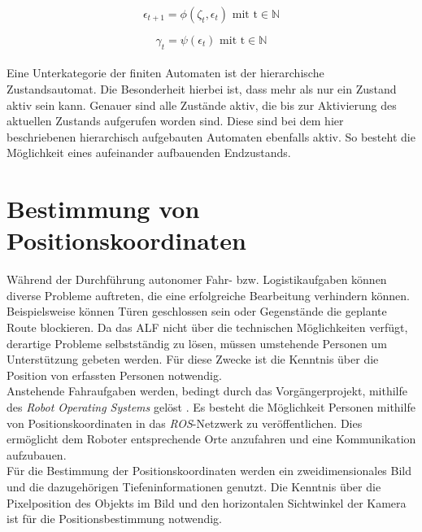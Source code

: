 	\begin{equation}
		\epsilon_{t+1}=\phi(\zeta_t,\epsilon_t)\text{    mit    t}\in\mathbb{N}
		\label{eq: Mealy1}
	\end{equation}
	
	\begin{equation}
		\gamma_t=\psi(\epsilon_t)\text{    mit    t}\in\mathbb{N}
		\label{eq: Mealy2}
	\end{equation}
	\\
	
	
	Eine Unterkategorie der finiten Automaten ist der hierarchische Zustandsautomat. Die Besonderheit hierbei ist, dass mehr als nur ein Zustand aktiv sein kann. Genauer sind alle Zustände aktiv, die bis zur Aktivierung des aktuellen Zustands aufgerufen worden sind. Diese sind bei dem hier beschriebenen hierarchisch aufgebauten Automaten ebenfalls aktiv. So besteht die Möglichkeit eines aufeinander aufbauenden Endzustands. \cite{hsm}
	
	
		
	
	\section{Bestimmung von Positionskoordinaten}
	\label{sec: Bestimmung der Positionskoordinaten}
		Während der Durchführung autonomer Fahr- bzw. Logistikaufgaben können diverse Probleme auftreten, die eine erfolgreiche Bearbeitung verhindern können. Beispielsweise können Türen geschlossen sein oder Gegenstände die geplante Route blockieren. Da das ALF nicht über die technischen Möglichkeiten verfügt, derartige Probleme selbstständig zu lösen, müssen umstehende Personen um Unterstützung gebeten werden. Für diese Zwecke ist die Kenntnis über die Position von erfassten Personen notwendig.\\
		
	
		Anstehende Fahraufgaben werden, bedingt durch das Vorgängerprojekt, mithilfe des \textit{Robot Operating Systems} gelöst \cite{Bachelorarbeit}. Es besteht die Möglichkeit Personen mithilfe von Positionskoordinaten in das \textit{ROS}-Netzwerk zu veröffentlichen. Dies ermöglicht dem Roboter entsprechende Orte anzufahren und eine Kommunikation aufzubauen.\\
		
		Für die Bestimmung der Positionskoordinaten werden ein zweidimensionales Bild und die dazugehörigen Tiefeninformationen genutzt. Die Kenntnis über die Pixelposition des Objekts im Bild und den horizontalen Sichtwinkel der Kamera ist für die Positionsbestimmung notwendig.\\
		
